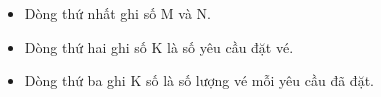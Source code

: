 \begin{itemize}
	\item     Dòng thứ nhất ghi số M và N.   
	\item     Dòng thứ hai ghi số K là số yêu cầu đặt vé.   
	\item     Dòng thứ ba ghi K số là số lượng vé mỗi yêu cầu đã đặt.   
\end{itemize}